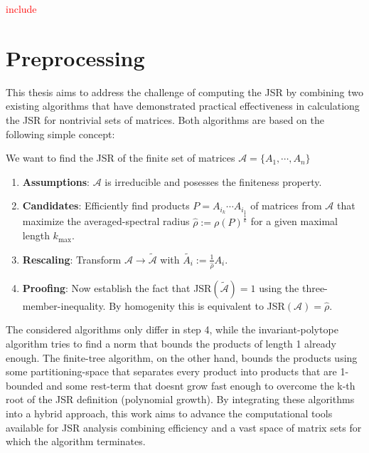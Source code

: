 \begin{example}
    \textcolor{red}{include}
\end{example}

\section{Preprocessing}
\label{sec:preprocessing}
This thesis aims to address the challenge of computing the JSR by combining two existing algorithms that have demonstrated practical effectiveness in calculationg the JSR for nontrivial sets of matrices. Both algorithms are based on the following simple concept:

We want to find the JSR of the finite set of matrices $\mathcal{A} = \{A_1, \cdots, A_n\}$
\begin{enumerate}
    \item \textbf{Assumptions}: $\mathcal{A}$ is irreducible and posesses the finiteness property. 
    \item \textbf{Candidates}: Efficiently find products $P = A_{i_k} \cdots A_{i_1}$ of matrices from $\mathcal{A}$ that maximize the averaged-spectral radius $\hat{\rho} := \rho(P)^\frac{1}{k}$ for a given maximal length $k_{\text{max}}$.
    \item \textbf{Rescaling}: Transform $\mathcal{A} \to \tilde{\mathcal{A}}$ with $\tilde{A_i} := \frac{1}{\hat{\rho}} A_i$.
    \item \textbf{Proofing}: Now establish the fact that JSR$(\tilde{\mathcal{A}}) = 1$ using the three-member-inequality. By homogenity this is equivalent to JSR$(\mathcal{A}) = \hat{\rho}$.
\end{enumerate}

The considered algorithms only differ in step 4, while the invariant-polytope algorithm tries to find a norm that bounds the products of length 1 already enough. The finite-tree algorithm, on the other hand, bounds the products using some partitioning-space that separates every product into products that are 1-bounded and some rest-term that doesnt grow fast enough to overcome the k-th root of the JSR definition (polynomial growth).
By integrating these algorithms into a hybrid approach, this work aims to advance the computational tools available for JSR analysis combining efficiency and a vast space of matrix sets for which the algorithm terminates.

